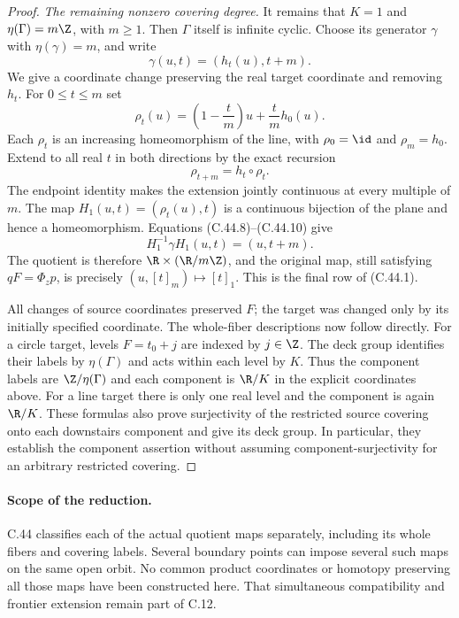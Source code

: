 \begin{proof}
\emph{The remaining nonzero covering degree.}
It remains that $K=1$ and
$\eta(\Gamma)=m\Z$, with $m\geq1$.
Then $\Gamma$ itself is infinite
cyclic. Choose its generator
$\gamma$ with $\eta(\gamma)=m$,
and write
\[
                   \gamma(u,t)=(h_t(u),t+m).
                                                               \tag{C.44.8}
\]
We give a coordinate change
preserving the real target
coordinate and removing $h_t$.
For $0\leq t\leq m$ set
\[
 \rho_t(u)=
          \left(1-\frac{t}{m}\right)u
                   +\frac{t}{m}h_0(u).
                                                               \tag{C.44.9}
\]
Each $\rho_t$ is an increasing
homeomorphism of the line, with
$\rho_0=\id$ and $\rho_m=h_0$.
Extend to all real $t$ in both
directions by the exact recursion
\[
                     \rho_{t+m}=h_t\circ\rho_t.
                                                               \tag{C.44.10}
\]
The endpoint identity makes the
extension jointly continuous at
every multiple of $m$.
The map
$H_1(u,t)=(\rho_t(u),t)$ is a
continuous bijection of the plane
and hence a homeomorphism.
Equations (C.44.8)--(C.44.10) give
\[
              H_1^{-1}\gamma H_1(u,t)=(u,t+m).
                                                               \tag{C.44.11}
\]
The quotient is therefore
$\R\times(\R/m\Z)$, and the
original map, still satisfying
$qF=\Phi_zp$, is precisely
$(u,[t]_m)\mapsto[t]_1$.
This is the final row of (C.44.1).

All changes of source coordinates
preserved $F$; the target was
changed only by its initially
specified coordinate.
The whole-fiber descriptions now
follow directly. For a circle
target, levels $F=t_0+j$ are
indexed by $j\in\Z$. The deck
group identifies their labels
by $\eta(\Gamma)$ and acts
within each level by $K$.
Thus the component labels are
$\Z/\eta(\Gamma)$ and each
component is $\R/K$ in the
explicit coordinates above.
For a line target there is
only one real level and the
component is again $\R/K$.
These formulas also prove
surjectivity of the restricted
source covering onto each
downstairs component and give
its deck group. In particular,
they establish the component
assertion without assuming
component-surjectivity for an
arbitrary restricted covering.
\end{proof}

\paragraph{Scope of the reduction.}
C.44 classifies each of the actual
quotient maps separately, including
its whole fibers and covering
labels. Several boundary points
can impose several such maps on
the same open orbit. No common
product coordinates or homotopy
preserving all those maps have
been constructed here. That
simultaneous compatibility and
frontier extension remain part
of C.12.
